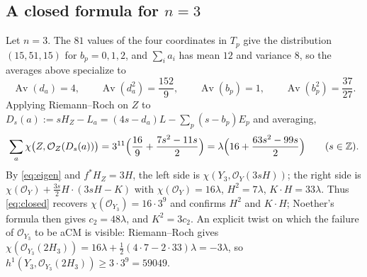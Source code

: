 \documentclass[11pt]{amsart}
\theoremstyle{remark}
\theoremstyle{definition}
\newcommand{\ZZ}{\mathbb{Z}}
\newcommand{\cO}{\mathcal{O}}
\DeclareMathOperator{\Av}{Av}
\begin{document}
\subsection*{A closed formula for \texorpdfstring{$n=3$}{n=3}}
Let $n=3$. The $81$ values of the four coordinates in $T_p$ give the distribution $(15,51,15)$ for $b_p=0,1,2$, and $\sum_ia_i$ has mean $12$ and variance $8$, so the averages above specialize to
\[
\Av(d_a)=4,\qquad\Av(d_a^2)=\frac{152}{9},\qquad\Av(b_p)=1,\qquad\Av(b_p^2)=\frac{37}{27}.
\]
Applying Riemann--Roch on $Z$ to $D_s(a):=sH_Z-L_a=(4s-d_a)L-\sum_p(s-b_p)E_p$ and averaging,
\begin{equation}\label{eq:closed}
\sum_a\chi\bigl(Z,\cO_Z(D_s(a))\bigr)=3^{11}\Bigl(\frac{16}{9}+\frac{7s^2-11s}{2}\Bigr)=\lambda\Bigl(16+\frac{63s^2-99s}{2}\Bigr)\qquad(s\in\ZZ).
\end{equation}
By \eqref{eq:eigen} and $f^*H_Z=3H$, the left side is $\chi(Y_3,\cO_Y(3sH))$; the right side is $\chi(\cO_Y)+\tfrac{3s}{2}H\cdot(3sH-K)$ with $\chi(\cO_Y)=16\lambda$, $H^2=7\lambda$, $K\cdot H=33\lambda$. Thus \eqref{eq:closed} recovers $\chi(\cO_{Y_3})=16\cdot3^9$ and confirms $H^2$ and $K\cdot H$; Noether's formula then gives $c_2=48\lambda$, and $K^2=3c_2$. An explicit twist on which the failure of $\cO_{Y_3}$ to be aCM is visible: Riemann--Roch gives $\chi(\cO_{Y_3}(2H_3))=16\lambda+\tfrac12(4\cdot7-2\cdot33)\lambda=-3\lambda$, so $h^1(Y_3,\cO_{Y_3}(2H_3))\ge3\cdot3^9=59049$.
\end{document}
